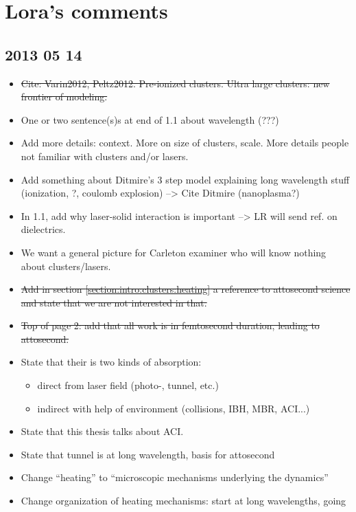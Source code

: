 \section*{Lora's comments}

\subsection*{2013 05 14}

\begin{itemize}
\item \sout{Cite: Varin2012, Peltz2012. Pre-ionized
clusters. Ultra large clusters: new frontier of modeling.}
\item One or two sentence(s)s at end of 1.1 about wavelength (???)
\item Add more details: context. More on size of clusters, scale. More details
people not familiar with clusters and/or lasers.
\item Add something about Ditmire's 3 step model explaining long wavelength stuff
(ionization, ?, coulomb explosion) --> Cite Ditmire (nanoplasma?)
\item In 1.1, add why laser-solid interaction is important --> LR will send ref.
on dielectrics.
\item We want a general picture for Carleton examiner who will know nothing about
clusters/lasers.
\item \sout{Add in section \ref{section:intro:clusters:heating} a reference to
attosecond science and state that we are not interested in that.}
\item \sout{Top of page 2: add that all work is in femtosecond duration, leading to
attosecond.}
\item State that their is two kinds of absorption:
    \begin{itemize}
    \item direct from laser field (photo-, tunnel, etc.)
    \item indirect with help of environment (collisions, IBH, MBR, ACI...)
    \end{itemize}
\item State that this thesis talks about ACI.
\item State that tunnel is at long wavelength, basis for attosecond
\item Change ``heating'' to ``microscopic mechanisms underlying the dynamics''
\item Change organization of heating mechanisms: start at long wavelengths, going

\end{itemize}
